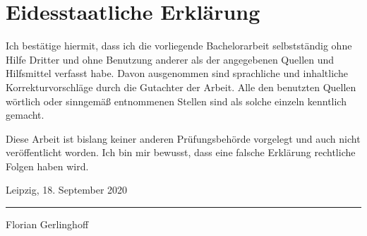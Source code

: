 \thispagestyle{empty}
\chapter*{Eidesstaatliche Erklärung}

Ich bestätige hiermit, dass ich die vorliegende Bachelorarbeit selbstständig ohne Hilfe Dritter und ohne Benutzung anderer als der angegebenen Quellen und Hilfsmittel verfasst habe. Davon ausgenommen sind sprachliche und inhaltliche Korrekturvorschläge durch die Gutachter der Arbeit. Alle den benutzten Quellen wörtlich oder sinngemäß entnommenen Stellen sind als solche einzeln kenntlich gemacht.

Diese Arbeit ist bislang keiner anderen Prüfungsbehörde vorgelegt und auch nicht veröffentlicht worden. Ich bin mir bewusst, dass eine falsche Erklärung rechtliche Folgen haben wird.

\para{}Leipzig, 18. September 2020
\vspace*{1cm}

\noindent{}\rule{\signaturelength}{0.5pt}

\noindent{}Florian Gerlinghoff